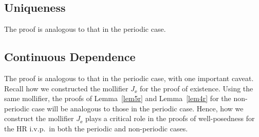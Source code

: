 \subsection{Uniqueness} The proof is analogous to that in the periodic case.
\subsection{Continuous Dependence} The proof is analogous to that in
the periodic case, with one important caveat. Recall how we constructed
the mollifier
$J_\ee$ for the proof of existence. Using the same mollifier, the proofs of Lemma~\ref{lem5r} and Lemma~\ref{lem4r} for the non-periodic case will be
analogous to those in the periodic case. Hence, how we
construct the mollifier $J_\ee$ plays a critical role in the proofs of
well-posedness for the HR i.v.p.\ in both the periodic and non-periodic cases. %
%
